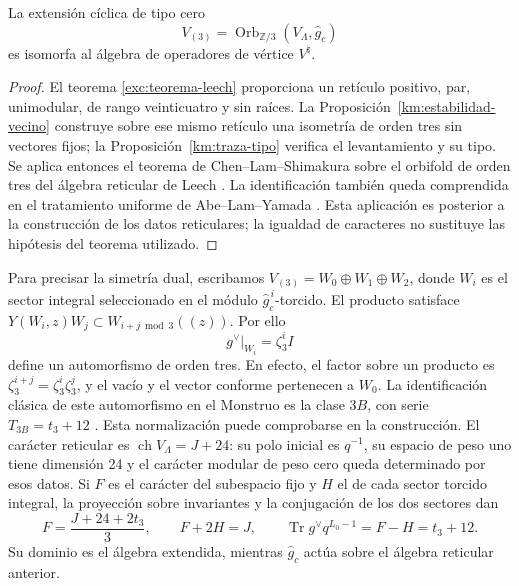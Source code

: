 \begin{theorem}
\label{km:moonshine-tres}
La extensión cíclica de tipo cero
\begin{equation}
 V_{(3)}=\operatorname{Orb}_{\mathbb Z/3}
                 (V_\Lambda,\widehat g_c)
 \label{km:extension-orden3}
\end{equation}
es isomorfa al álgebra de operadores de vértice \(V^\natural\).
\end{theorem}
\begin{proof}
El teorema \ref{exc:teorema-leech} proporciona un retículo positivo,
par, unimodular, de rango veinticuatro y sin raíces. La
Proposición~\ref{km:estabilidad-vecino} construye sobre ese mismo
retículo una isometría de orden tres sin vectores fijos; la
Proposición~\ref{km:traza-tipo} verifica el levantamiento y su tipo.
Se aplica entonces el teorema de Chen--Lam--Shimakura sobre el
orbifold de orden tres del álgebra reticular de Leech
\cite{chenlamshimakura2016}. La identificación también queda comprendida
en el tratamiento uniforme de Abe--Lam--Yamada
\cite{abelamyamada2017}. Esta aplicación es posterior a la construcción
de los datos reticulares; la igualdad de caracteres no sustituye las
hipótesis del teorema utilizado.
\end{proof}

Para precisar la simetría dual, escribamos
\(V_{(3)}=W_0\oplus W_1\oplus W_2\), donde \(W_i\) es el sector
integral seleccionado en el módulo \(\widehat g_c^{\,i}\)-torcido.
El producto satisface
\(Y(W_i,z)W_j\subset W_{i+j\bmod3}((z))\). Por ello
\begin{equation}
 g^\vee|_{W_i}=\zeta_3^i I
 \label{km:dual-ciclico}
\end{equation}
define un automorfismo de orden tres. En efecto, el factor sobre un
producto es \(\zeta_3^{i+j}=\zeta_3^i\zeta_3^j\), y el vacío y el
vector conforme pertenecen a \(W_0\). La identificación clásica de
este automorfismo en el Monstruo es la clase \(3B\), con serie
\(T_{3B}=t_3+12\) \cite{kmconwaynorton1979,borcherds}.
Esta normalización puede comprobarse en la construcción. El carácter
reticular es \(\operatorname{ch}V_\Lambda=J+24\): su polo inicial
es \(q^{-1}\), su espacio de peso uno tiene dimensión 24 y el
carácter modular de peso cero queda determinado por esos datos.
Si \(F\) es el carácter del subespacio fijo y \(H\) el de cada
sector torcido integral, la proyección sobre invariantes y la conjugación
de los dos sectores dan
\[
 F=\frac{J+24+2t_3}{3},\qquad F+2H=J,
 \qquad \operatorname{Tr}g^\vee q^{L_0-1}=F-H=t_3+12.
\]
Su dominio es el álgebra extendida, mientras
\(\widehat g_c\) actúa sobre el álgebra reticular anterior.

